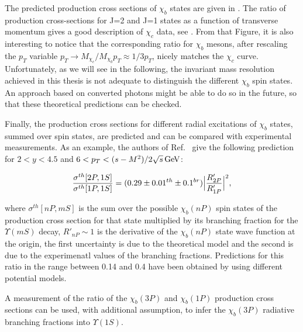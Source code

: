 The predicted production cross sections of $\chi_b$ states are
given in . The ratio of production cross-sections for 
J=2 and J=1 states as a function of transverse
momentum gives a good description of $\chi_c$ data, see . From that Figure, 
it is also interesting to notice that the corresponding ratio for $\chi_b$ mesons, after rescaling the 
$p_T$ variable $p_T \rightarrow M_{\chi_c} / M_{\chi_b} p_T \approx 1/3 p_T$, nicely matches 
the $\chi_c$ curve. Unfortunately, as we will see in the following, the invariant mass resolution achieved 
in this thesis is not adequate to distinguish the different $\chi_b$ spin states. An approach based on 
converted photons might be able to do so in the future, so that these theoretical predictions can be checked. 

Finally, the production cross sections for different radial excitations of $\chi_b$ states, summed over spin states, 
are predicted and can be compared with experimental measurements. As an example, the authors of Ref.~\cite{Likhoded:2012hw} give
the following prediction for $2 < y  < 4.5$ and $6 < p_T < (s-M^2)/2\sqrt{s} \mathrm{\,Ge\kern -0.1em V}$:

\begin{equation}
\frac{\sigma^{th}[2P,1S]}{\sigma^{th}[1P,1S]} = (0.29 \pm 0.01^{th} \pm 0.1^{br}) \Bigl| \frac{R'_{2P}}{R'_{1P}}\Bigr|^2, 
\end{equation}

\noindent where $\sigma^{th}[nP,mS]$ is the sum over the possible $\chi_b(nP)$ spin states of the production cross 
section for that state multiplied by its branching fraction for the $\Upsilon(mS)$ decay, $R'_{nP} \sim 1$ is the derivative 
of the $\chi_b(nP)$ state wave function at the origin, the first uncertainty is due to the theoretical model and the second 
is due to the experimenatl values of the branching fractions.  Predictions for this ratio in the range between 0.14 and 0.4 
have been obtained by using different potential models. 

A measurement of the ratio of the $\chi_b(3P)$ and $\chi_b(1P)$ production cross sections can be used, with additional assumption, 
to infer the $\chi_b(3P)$ radiative branching fractions into $\Upsilon(1S)$. 

